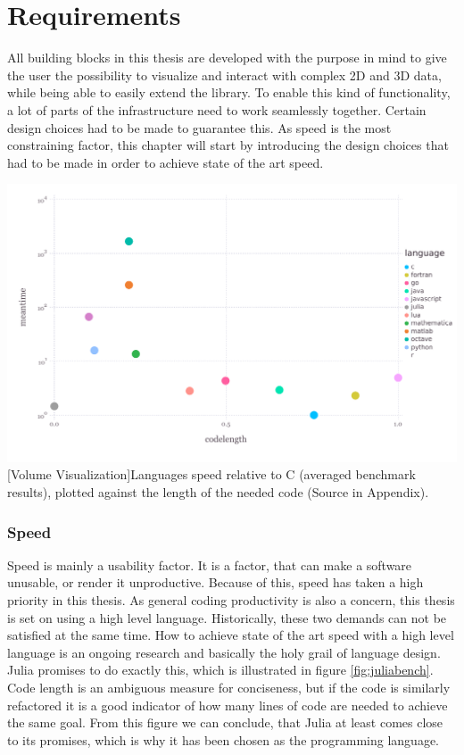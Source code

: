 \section{Requirements}

All building blocks in this thesis are developed with the purpose in mind to give the user the possibility to visualize and interact with complex 2D and 3D data, while being able to easily extend the library.
To enable this kind of functionality, a lot of parts of the infrastructure need to work seamlessly together.
Certain design choices had to be made to guarantee this. As speed is the most constraining factor, this chapter will start by introducing the design choices that had to be made in order to achieve state of the art speed.

\vspace{1em}
\begin{minipage}{\linewidth}
    \centering
    \includegraphics[width=0.9\linewidth]{graphics/julia_bench.pdf}
    [Volume Visualization]{Languages speed relative to C (averaged benchmark results), plotted against the length of the needed code (Source in Appendix).}
    \label{fig:juliabench}
\end{minipage}


\subsubsection{Speed}
Speed is mainly a usability factor. It is a factor, that can make a software unusable, or render it unproductive. Because of this, speed has taken a high priority in this thesis. As general coding productivity is also a concern, this thesis is set on using a high level language.
Historically, these two demands can not be satisfied at the same time.
How to achieve state of the art speed with a high level language is an ongoing research and basically the holy grail of language design. 
Julia promises to do exactly this, which is illustrated in figure \ref{fig:juliabench}. 
Code length is an ambiguous measure for conciseness, but if the code is similarly refactored it is a good indicator of how many lines of code are needed to achieve the same goal.
From this figure we can conclude, that Julia at least comes close to its promises, which is why it has been chosen as the programming language.

